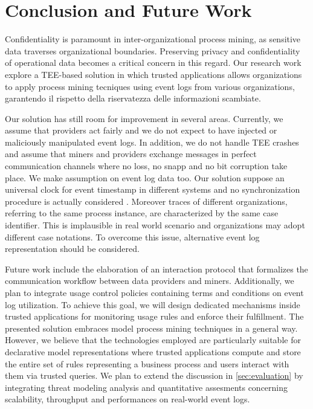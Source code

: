 \section{Conclusion and Future Work}
\label{sec:conclusion}

Confidentiality is paramount in inter-organizational process mining, as sensitive data traverses organizational boundaries. Preserving privacy and confidentiality of operational data becomes a critical concern in this regard. Our research work explore a TEE-based solution in which trusted applications allows organizations to apply process mining tecniques using event logs from various organizations, garantendo il rispetto della riservatezza delle informazioni scambiate.

Our solution has still room for improvement in several areas. Currently, we assume that providers act fairly and we do not expect to have injected or maliciously manipulated event logs. In addition, we do not handle TEE crashes and assume that miners and providers exchange messages in perfect communication channels where no loss, no snapp and no bit corruption take place. We make assumption on event log data too. Our solution suppose an universal clock for event timestamp in different systems and no synchronization procedure is actually considered \cite{}. Moreover traces of different organizations, referring to the same process instance, are characterized by the same case identifier. This is implausible in real world scenario and organizations may adopt different case notations. To overcome this issue, alternative event log representation should be considered.

Future work include the elaboration of an interaction protocol that formalizes the communication workflow between data providers and miners. Additionally, we plan to integrate usage control policies containing terms and conditions on event log utilization. To achieve this goal, we will design dedicated mechanisms inside trusted applications for monitoring usage rules and enforce their fulfillment. The presented solution embraces model process mining techniques in a general way. However, we believe that the technologies employed are particularly suitable for declarative model representations where trusted applications compute and store the entire set of rules representing a business process and users interact with them via trusted queries. We plan to extend the discussion in \cref{sec:evaluation} by integrating threat modeling analysis and quantitative assesments concerning scalability, throughput and performances on real-world event logs.


